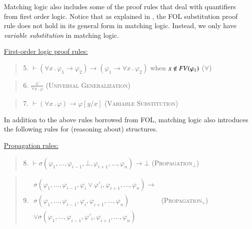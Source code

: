 \documentclass[UTF8,11pt]{article}
\theoremstyle{plain}
\theoremstyle{definition}
\theoremstyle{remark}
\newcommand{\imp}{\to}
\newcommand{\ddd}{,\dots,}
\newcommand{\ra}{\rightarrow}
\newcommand{\FV}{{\it FV}}
\begin{document}
Matching logic also includes some of the proof rules
that deal with quantifiers from first order logic.
Notice that as explained in \cite{rosu-2017-lmcs},
the FOL substitution proof rule
does not hold in its general form in matching logic.
Instead, we only have
\emph{variable substitution} in matching logic.

\vspace*{2ex}

\noindent
\underline{First-order logic proof rules:}

\begin{quote}
5. $\vdash (\forall x\,.\,\varphi_1\ra\varphi_2) \ra (\varphi_1 \ra \forall x\,.\,\varphi_2)$
when $x\not\in\FV(\varphi_1)$
\hfill \textsc{($\forall$)}
\end{quote}

\begin{quote}
6. $\displaystyle\frac{\varphi}{\forall x\,.\,\varphi}$
\hfill \textsc{(Universal Generalization)}
\end{quote}

\begin{quote}
7. $\vdash (\forall x\,.\,\varphi) \ra \varphi[y/x]$
\hfill \textsc{(Variable Substitution)}
\end{quote}

In addition to the above rules borrowed from FOL, matching
logic also introduces the following rules for (reasoning about) structures.

\vspace*{2ex}

\noindent
\underline{Propagation rules:}

\begin{quote}
8. $\vdash \sigma(\varphi_1 \ddd \varphi_{i-1}, \bot,
                  \varphi_{i+1} \ddd \varphi_n)
           \imp \bot$
\hfill \textsc{(Propagation$_\bot$)}
\end{quote}

\begin{quote}
9.
$
\begin{array}{l}
\sigma(
\varphi_1 \ddd \varphi_{i-1},
\varphi_i \vee \varphi'_i,
\varphi_{i+1} \ddd \varphi_n) \imp
\\
\sigma(\varphi_1 \ddd \varphi_{i-1}, \varphi_i,
\varphi_{i+1} \ddd \varphi_n)
\\
\vee
\sigma(\varphi_1 \ddd \varphi_{i-1}, \varphi'_i,
\varphi_{i+1} \ddd \varphi_n)
\end{array}
$
\hfill \textsc{(Propagation$_\vee$)}
\end{quote}
\end{document}
